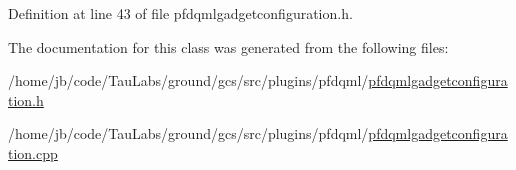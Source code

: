 \-Definition at line 43 of file pfdqmlgadgetconfiguration.\-h.



\-The documentation for this class was generated from the following files\-:\begin{DoxyCompactItemize}
\item 
/home/jb/code/\-Tau\-Labs/ground/gcs/src/plugins/pfdqml/\hyperlink{pfdqmlgadgetconfiguration_8h}{pfdqmlgadgetconfiguration.\-h}\item 
/home/jb/code/\-Tau\-Labs/ground/gcs/src/plugins/pfdqml/\hyperlink{pfdqmlgadgetconfiguration_8cpp}{pfdqmlgadgetconfiguration.\-cpp}\end{DoxyCompactItemize}
